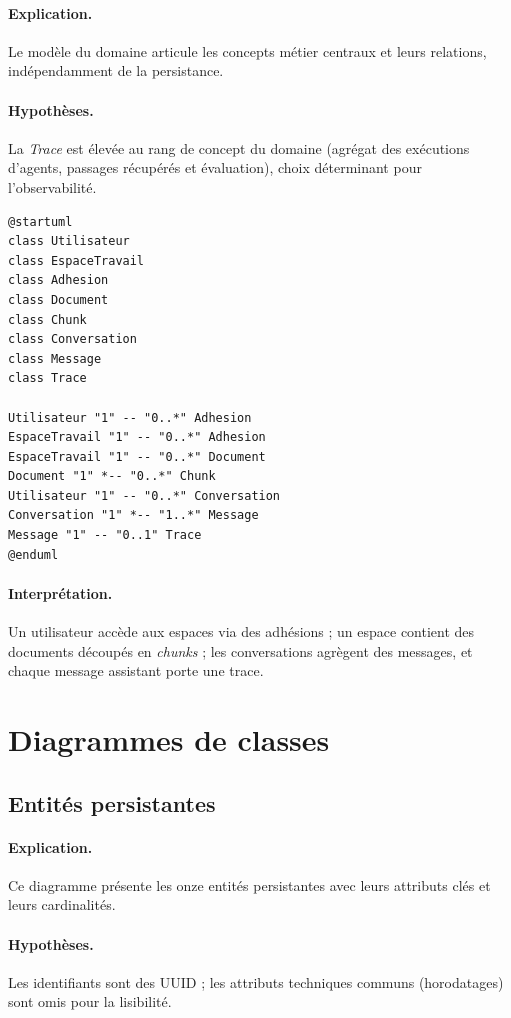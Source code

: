 \paragraph{Explication.} Le modèle du domaine articule les concepts métier
centraux et leurs relations, indépendamment de la persistance.
\paragraph{Hypothèses.} La \emph{Trace} est élevée au rang de concept du domaine
(agrégat des exécutions d'agents, passages récupérés et évaluation), choix
déterminant pour l'observabilité.

\begin{lstlisting}[style=plantuml,caption={Modèle du domaine},label={lst:domaine}]
@startuml
class Utilisateur
class EspaceTravail
class Adhesion
class Document
class Chunk
class Conversation
class Message
class Trace

Utilisateur "1" -- "0..*" Adhesion
EspaceTravail "1" -- "0..*" Adhesion
EspaceTravail "1" -- "0..*" Document
Document "1" *-- "0..*" Chunk
Utilisateur "1" -- "0..*" Conversation
Conversation "1" *-- "1..*" Message
Message "1" -- "0..1" Trace
@enduml
\end{lstlisting}

\paragraph{Interprétation.} Un utilisateur accède aux espaces via des adhésions ;
un espace contient des documents découpés en \emph{chunks} ; les conversations
agrègent des messages, et chaque message assistant porte une trace.

\section{Diagrammes de classes}
\subsection{Entités persistantes}
\paragraph{Explication.} Ce diagramme présente les onze entités persistantes avec
leurs attributs clés et leurs cardinalités.
\paragraph{Hypothèses.} Les identifiants sont des UUID ; les attributs techniques
communs (horodatages) sont omis pour la lisibilité.

